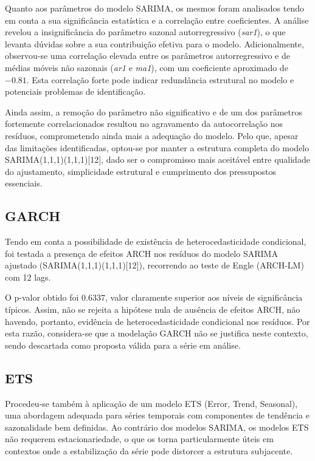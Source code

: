 \documentclass[journal]{IEEEtran}
\begin{document}
Quanto aos parâmetros do modelo SARIMA, os mesmos foram analisados tendo em conta a sua significância estatística e a correlação entre coeficientes. A análise revelou a insignificância do parâmetro sazonal autorregressivo (\textit{sar1}), o que levanta dúvidas sobre a sua contribuição efetiva para o modelo. Adicionalmente, observou-se uma correlação elevada entre os parâmetros autorregressivo e de médias móveis não sazonais (\textit{ar1} e \textit{ma1}), com um coeficiente aproximado de $-0.81$. Esta correlação forte pode indicar redundância estrutural no modelo e potenciais problemas de identificação.

Ainda assim, a remoção do parâmetro não significativo e de um dos parâmetros fortemente correlacionados resultou no agravamento da autocorrelação nos resíduos, comprometendo ainda mais a adequação do modelo. Pelo que, apesar das limitações identificadas, optou-se por manter a estrutura completa do modelo SARIMA(1,1,1)(1,1,1)[12], dado ser o compromisso mais aceitável entre qualidade do ajustamento, simplicidade estrutural e cumprimento dos pressupostos essenciais.

\subsection{GARCH}

Tendo em conta a possibilidade de existência de heterocedasticidade condicional, foi testada a presença de efeitos ARCH nos resíduos do modelo SARIMA ajustado (SARIMA(1,1,1)(1,1,1)[12]), recorrendo ao teste de Engle (ARCH-LM) com 12 lags.

O p-valor obtido foi $0.6337$, valor claramente superior aos níveis de significância típicos. Assim, não se rejeita a hipótese nula de ausência de efeitos ARCH, não havendo, portanto, evidência de heterocedasticidade condicional nos resíduos. Por esta razão, considera-se que a modelação GARCH não se justifica neste contexto, sendo descartada como proposta válida para a série em análise.

\subsection{ETS}

Procedeu-se também à aplicação de um modelo ETS (Error, Trend, Seasonal), uma abordagem adequada para séries temporais com componentes de tendência e sazonalidade bem definidas. Ao contrário dos modelos SARIMA, os modelos ETS não requerem estacionariedade, o que os torna particularmente úteis em contextos onde a estabilização da série pode distorcer a estrutura subjacente.
\end{document}
